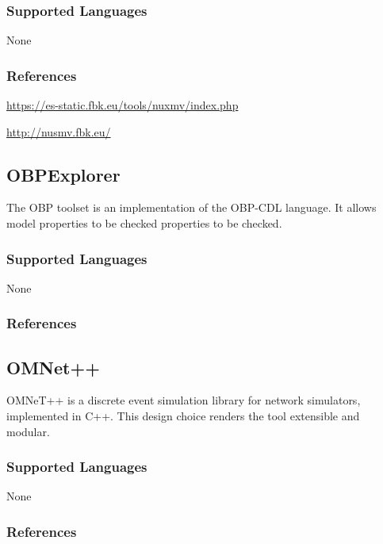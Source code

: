 \subsubsection{Supported Languages}

None


\subsubsection{References}

\url{https://es-static.fbk.eu/tools/nuxmv/index.php}

\url{http://nusmv.fbk.eu/}


\subsection{OBPExplorer}
\label{subsecT:OBPExplorer}


The OBP toolset is an implementation of the OBP-CDL language.
It allows model properties to be checked properties to be checked.


\subsubsection{Supported Languages}

None


\subsubsection{References}





\subsection{OMNet++}
\label{subsecT:OMNet++}


OMNeT++ is a discrete event simulation library for network simulators, implemented in C++.
This design choice renders the tool extensible and modular.

\subsubsection{Supported Languages}

None


\subsubsection{References}

